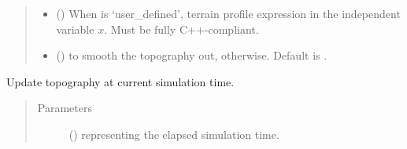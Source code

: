 \documentclass[letterpaper,10pt,english]{sphinxmanual}
\begin{document}
\begin{fulllineitems}
\begin{fulllineitems}
\begin{quote}
\begin{description}
\begin{itemize}
\item {} 
 () \textendash{} When  is ‘user\_defined’, terrain profile expression in the independent variable \(x\).
Must be fully C++-compliant.

\item {} 
 () \textendash{}  to smooth the topography out,  otherwise. Default is .

\end{itemize}

\end{description}\end{quote}

\end{fulllineitems}


\begin{fulllineitems}
\label{\detokenize{api:grids.topography.Topography1d.update}}
Update topography at current simulation time.
\begin{quote}\begin{description}
\item[{Parameters}] \leavevmode
{} () \textendash{}  representing the elapsed simulation time.

\end{description}\end{quote}

\end{fulllineitems}


\end{fulllineitems}

\end{document}
